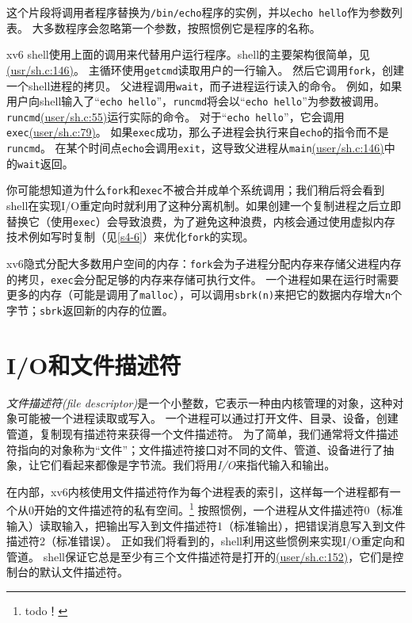 这个片段将调用者程序替换为\texttt{/bin/echo}程序的实例，并以\texttt{echo hello}作为参数列表。
大多数程序会忽略第一个参数，按照惯例它是程序的名称。

xv6 shell使用上面的调用来代替用户运行程序。shell的主要架构很简单，见\href{https://github.com/mit-pdos/xv6-riscv/blob/riscv/user/sh.c#L146}{(usr/sh.c:146)}。
主循环使用\texttt{getcmd}读取用户的一行输入。
然后它调用\texttt{fork}，创建一个shell进程的拷贝。
父进程调用\texttt{wait}，而子进程运行读入的命令。
例如，如果用户向shell输入了“\texttt{echo hello}”，\texttt{runcmd}将会以“\texttt{echo hello}”为参数被调用。
\texttt{runcmd}\href{https://github.com/mit-pdos/xv6-riscv/blob/riscv/user/sh.c#L55}{(user/sh.c:55)}运行实际的命令。
对于“\texttt{echo hello}”，它会调用\texttt{exec}\href{https://github.com/mit-pdos/xv6-riscv/blob/riscv/user/sh.c#L79}{(user/sh.c:79)}。
如果\texttt{exec}成功，那么子进程会执行来自\texttt{echo}的指令而不是\texttt{runcmd}。
在某个时间点\texttt{echo}会调用\texttt{exit}，这导致父进程从\texttt{main}\href{https://github.com/mit-pdos/xv6-riscv/blob/riscv/user/sh.c#L146}{(user/sh.c:146)}中的\texttt{wait}返回。

你可能想知道为什么\texttt{fork}和\texttt{exec}不被合并成单个系统调用；我们稍后将会看到shell在实现I/O重定向时就利用了这种分离机制。如果创建一个复制进程之后立即替换它（使用\texttt{exec}）会导致浪费，为了避免这种浪费，内核会通过使用虚拟内存技术例如写时复制（见\autoref{s4-6}）来优化\texttt{fork}的实现。

xv6隐式分配大多数用户空间的内存：\texttt{fork}会为子进程分配内存来存储父进程内存的拷贝，\texttt{exec}会分配足够的内存来存储可执行文件。
一个进程如果在运行时需要更多的内存（可能是调用了\texttt{malloc}），可以调用\texttt{sbrk(n)}来把它的数据内存增大\texttt{n}个字节；\texttt{sbrk}返回新的内存的位置。

\section{I/O和文件描述符}

\emph{文件描述符(file descriptor)}是一个小整数，它表示一种由内核管理的对象，这种对象可能被一个进程读取或写入。
一个进程可以通过打开文件、目录、设备，创建管道，复制现有描述符来获得一个文件描述符。
为了简单，我们通常将文件描述符指向的对象称为“文件”；文件描述符接口对不同的文件、管道、设备进行了抽象，让它们看起来都像是字节流。我们将用\emph{I/O}来指代输入和输出。

在内部，xv6内核使用文件描述符作为每个进程表的索引，这样每一个进程都有一个从0开始的文件描述符的私有空间。\footnote{todo！}
按照惯例，一个进程从文件描述符0（标准输入）读取输入，把输出写入到文件描述符1（标准输出），把错误消息写入到文件描述符2（标准错误）。
正如我们将看到的，shell利用这些惯例来实现I/O重定向和管道。
shell保证它总是至少有三个文件描述符是打开的\href{https://github.com/mit-pdos/xv6-riscv/blob/risc/user/sh.c#L152}{(user/sh.c:152)}，它们是控制台的默认文件描述符。

